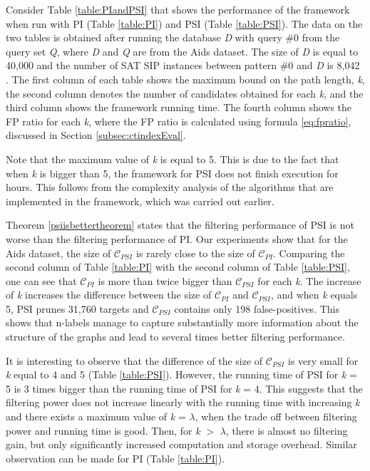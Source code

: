 \documentclass{l4proj}
\newcommand{\fancyC}{\mathcal{C}}
\begin{document}
Consider Table \ref{table:PIandPSI} that shows the performance of the framework when run with PI (Table \ref{table:PI}) and PSI (Table \ref{table:PSI}). The data on the two tables is obtained after running the database \emph{D} with query \#0 from the query set \emph{Q}, where \emph{D} and \emph{Q} are from the Aids dataset. The size of \emph{D} is equal to 40,000 and the number of SAT SIP instances between pattern \#0 and \emph{D} is 8,042 \cite{datasets}. The first column of each table shows the maximum bound on the path length, \emph{k}, the second column denotes the number of candidates obtained for each \emph{k}, and the third column shows the framework running time. The fourth column shows the FP ratio for each \emph{k}, where the FP ratio is calculated using formula \ref{eq:fpratio}, discussed in Section \ref{subsec:ctindexEval}.

Note that the maximum value of \emph{k} is equal to 5. This is due to the fact that when \emph{k} is bigger than 5, the framework for PSI does not finish execution for hours. This follows from the complexity analysis of the algorithms that are implemented in the framework, which was carried out earlier. 

Theorem \ref{psiisbettertheorem} states that the filtering performance of PSI is not worse than the filtering performance of PI. Our experiments show that for the Aids dataset, the size of $\fancyC_{PSI}$ is rarely close to the size of $\fancyC_{PI}$. Comparing the second column of Table \ref{table:PI} with the second column of Table \ref{table:PSI}, one can see that $\fancyC_{PI}$ is more than twice bigger than $\fancyC_{PSI}$ for each \emph{k}. The increase of \emph{k} increases the difference between the size of $\fancyC_{PI}$ and $\fancyC_{PSI}$, and when \emph{k} equals 5, PSI prunes 31,760 targets and $\fancyC_{PSI}$ contains only 198 false-positives. This shows that n-labels manage to capture substantially more information about the structure of the graphs and lead to several times better filtering performance.

It is interesting to observe that the difference of the size of $\fancyC_{PSI}$ is very small for \emph{k} equal to 4 and 5 (Table \ref{table:PSI}). However, the running time of PSI for \emph{k} = 5 is 3 times bigger than the running time of PSI for \emph{k} = 4. This suggests that the filtering power does not increase linearly with the running time with increasing \emph{k} and there exists a maximum value of \emph{k} = $\lambda$, when the trade off between filtering power and running time is good. Then, for \emph{k} $>$ $\lambda$, there is almost no filtering gain, but only significantly increased computation and storage overhead. Similar observation can be made for PI (Table \ref{table:PI}).
\end{document}
